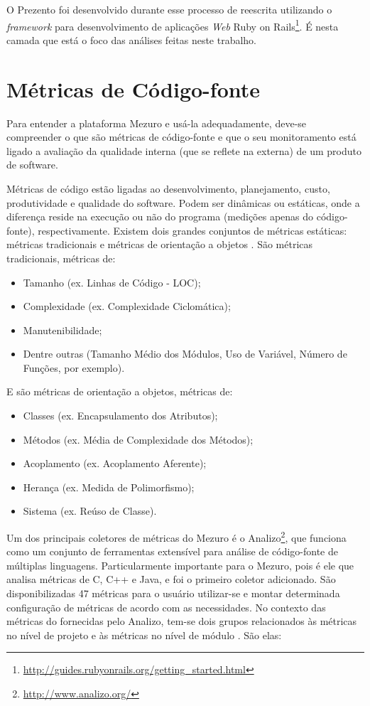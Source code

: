 O Prezento foi desenvolvido durante esse processo de reescrita utilizando o
\textit{framework} para desenvolvimento de aplicações \textit{Web} Ruby on
Rails\footnote{\url{http://guides.rubyonrails.org/getting_started.html}}.
%
É nesta camada que está o foco das análises feitas neste trabalho.

\section{Métricas de Código-fonte}

Para entender a plataforma Mezuro e usá-la adequadamente, deve-se compreender
o que são métricas de código-fonte e que o seu monitoramento está ligado a
avaliação da qualidade interna (que se reflete na externa) de um produto de
software.

Métricas de código estão ligadas ao desenvolvimento, planejamento, custo,
produtividade e qualidade do software. Podem ser dinâmicas ou estáticas, onde a
diferença reside na execução ou não do programa (medições apenas do código-fonte),
respectivamente. Existem dois grandes conjuntos de métricas estáticas:
métricas tradicionais e métricas de orientação a objetos
\cite{meirelles2013monitoramento}. São métricas tradicionais, métricas de:
\begin{itemize}
  \item Tamanho (ex. Linhas de Código - LOC);
  \item Complexidade (ex. Complexidade Ciclomática);
  \item Manutenibilidade;
  \item Dentre outras (Tamanho Médio dos Módulos, Uso de Variável, Número de
  Funções, por exemplo).
\end{itemize}
E são métricas de orientação a objetos, métricas de:
\begin{itemize}
  \item Classes (ex. Encapsulamento dos Atributos);
  \item Métodos (ex. Média de Complexidade dos Métodos);
  \item Acoplamento (ex. Acoplamento Aferente);
  \item Herança (ex. Medida de Polimorfismo);
  \item Sistema (ex. Reúso de Classe).
\end{itemize}

Um dos principais coletores de métricas do Mezuro é o Analizo\footnote{\url{http://www.analizo.org/}},
que funciona como um conjunto de ferramentas extensível para análise de
código-fonte de múltiplas linguagens. Particularmente importante para o Mezuro,
pois é ele que analisa métricas de C, C++ e Java, e foi o primeiro coletor
adicionado. São disponibilizadas 47 métricas para o usuário utilizar-se e montar
determinada configuração de métricas de acordo com as necessidades. No contexto
das métricas do fornecidas pelo Analizo, tem-se dois grupos relacionados às
métricas no nível de projeto e às métricas no nível de módulo
\cite{terceiro2010analizo}. São elas:

